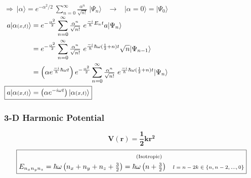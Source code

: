 \documentclass[12pt]{article}
\newcommand{\mathscriptsize}[1]{\text{\scriptsize\(#1\)}}
\newcommand{\mss}[1]{\mathscriptsize{#1}}
\begin{document}
\begin{minipage}{.51\textwidth}
    \( \displaystyle \Rightarrow \ \boxed{ \big| \alpha \big\rangle 
    = e^{- \alpha^{2} / 2} \ \sum_{n=0}^\infty 
    \tfrac{\alpha^n}{\sqrt{n!}} \ | \Psi_n \rangle } \) 
    \ \(\rightarrow\) \
    \( \big| \alpha {\scriptstyle =} 0 \big\rangle = | \Psi_0 \rangle \)\\[10pt]
    \( \begin{aligned}
        a | \alpha{\scriptstyle(x,t)} \rangle 
            &= e^{- \frac{\alpha^{2}}{2}} \sum_{n=0}^\infty 
            \tfrac{\alpha^n}{\sqrt{n!}} \ e^{\frac{-i}{\hbar} E_n t} a | \Psi_n \rangle\\
        &= e^{- \frac{\alpha^{2}}{2}} \sum_{n=0}^\infty 
            \tfrac{\alpha^n}{\sqrt{n!}} \ e^{\frac{-i}{\hbar} 
            \hbar \omega (\frac{1}{2} + n) t} \sqrt{n} | \Psi_{n-1} \rangle \\
        &= \left( \alpha e^{\frac{-i}{\hbar} \hbar \omega t} \right) e^{- \frac{\alpha^{2}}{2}}
            \sum_{n=0}^\infty \tfrac{\alpha^n}{\sqrt{n!}} \ e^{\frac{-i}{\hbar} 
            \hbar \omega (\frac{1}{2} + n) t} | \Psi_n \rangle\\
        \Aboxed{ a | \alpha{\scriptstyle(x,t)} \rangle 
            &= \left( \alpha e^{-i \omega t} \right) | \alpha{\scriptstyle(x,t)} \rangle }
    \end{aligned} \)
\end{minipage}

\vspace{1cm}

\vspace{10pt}\noindent
\subsubsection{3-D Harmonic Potential}

\[ \boldsymbol{V(r) = \frac{1}{2} k r^2} \]
\[ \boxed{ 
    E_{n_x n_y n_z} = \hbar \omega \left(n_x + n_y + n_z + \tfrac{3}{2}\right) 
    = \begin{gathered}[b]
        \text{\scriptsize(Isotropic)}\\[-1pt]
        \hbar\omega \left( n + \tfrac{3}{2} \right) 
    \end{gathered}
    \hspace{10pt} \mss{l = n - 2k \in \{ n, n-2, ..., 0 \}}
} \]
\end{document}
